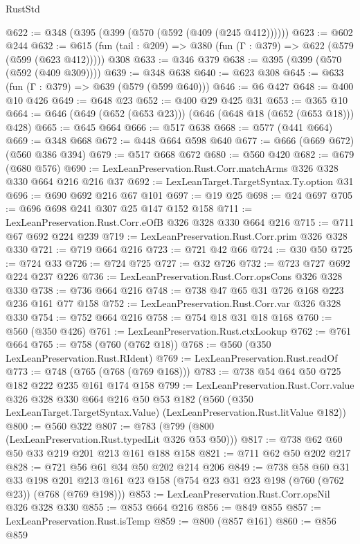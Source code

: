 \begin{lexlean}{RustStd}
\begin{coremodule}
@622 := @348 (@395 (@399 (@570 (@592 (@409 (@245 @412))))))
@623 := @602 @244
@632 := @615 (fun (tail : @209) => @380 (fun (Γ : @379) => @622 (@579 (@599 (@623 @412))))) @308
@633 := @346 @379
@638 := @395 (@399 (@570 (@592 (@409 @309))))
@639 := @348 @638
@640 := @623 @308
@645 := @633 (fun (Γ : @379) => @639 (@579 (@599 @640)))
@646 := @6 @427
@648 := @400 @10 @426
@649 := @648 @23
@652 := @400 @29 @425 @31
@653 := @365 @10
@664 := @646 (@649 (@652 (@653 @23))) (@646 (@648 @18 (@652 (@653 @18))) @428)
@665 := @645 @664
@666 := @517 @638
@668 := @577 (@441 @664)
@669 := @348 @668
@672 := @448 @664 @598 @640
@677 := @666 (@669 @672) (@560 @386 @394)
@679 := @517 @668 @672
@680 := @560 @420
@682 := @679 (@680 @576)
@690 := LexLeanPreservation.Rust.Corr.matchArms @326 @328 @330 @664 @216 @216 @37
@692 := LexLeanTarget.TargetSyntax.Ty.option @31
@696 := @690 @692 @216 @67 @101
@697 := @19 @25
@698 := @24 @697
@705 := @696 @698 @241 @307 @25 @147 @152 @158
@711 := LexLeanPreservation.Rust.Corr.eOfB @326 @328 @330 @664 @216
@715 := @711 @67 @692 @224 @239
@719 := LexLeanPreservation.Rust.Corr.prim @326 @328 @330
@721 := @719 @664 @216
@723 := @721 @42 @66
@724 := @30 @50
@725 := @724 @33
@726 := @724 @725
@727 := @32 @726
@732 := @723 @727 @692 @224 @237 @226
@736 := LexLeanPreservation.Rust.Corr.opsCons @326 @328 @330
@738 := @736 @664 @216
@748 := @738 @47 @65 @31 @726 @168 @223 @236 @161 @77 @158
@752 := LexLeanPreservation.Rust.Corr.var @326 @328 @330
@754 := @752 @664 @216
@758 := @754 @18 @31 @18 @168
@760 := @560 (@350 @426)
@761 := LexLeanPreservation.Rust.ctxLookup
@762 := @761 @664
@765 := @758 (@760 (@762 @18))
@768 := @560 (@350 LexLeanPreservation.Rust.RIdent)
@769 := LexLeanPreservation.Rust.readOf
@773 := @748 (@765 (@768 (@769 @168)))
@783 := @738 @54 @64 @50 @725 @182 @222 @235 @161 @174 @158
@799 := LexLeanPreservation.Rust.Corr.value
    @326
    @328
    @330
    @664
    @216
    @50
    @53
    @182
    (@560 (@350 LexLeanTarget.TargetSyntax.Value) (LexLeanPreservation.Rust.litValue @182))
@800 := @560 @322
@807 := @783 (@799 (@800 (LexLeanPreservation.Rust.typedLit @326 @53 @50)))
@817 := @738 @62 @60 @50 @33 @219 @201 @213 @161 @188 @158
@821 := @711 @62 @50 @202 @217
@828 := @721 @56 @61 @34 @50 @202 @214 @206
@849 := @738
    @58
    @60
    @31
    @33
    @198
    @201
    @213
    @161
    @23
    @158
    (@754 @23 @31 @23 @198 (@760 (@762 @23)) (@768 (@769 @198)))
@853 := LexLeanPreservation.Rust.Corr.opsNil @326 @328 @330
@855 := @853 @664 @216
@856 := @849 @855
@857 := LexLeanPreservation.Rust.isTemp
@859 := @800 (@857 @161)
@860 := @856 @859

\end{coremodule}
\end{lexlean}
